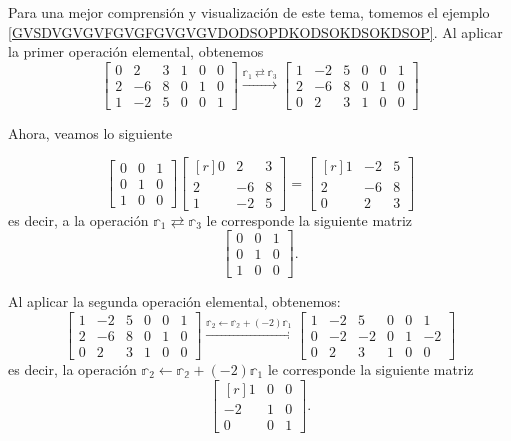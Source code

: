 Para una mejor comprensión y visualización de este tema, tomemos el ejemplo \ref{GVSDVGVGVFGVGFGVGVGVDODSOPDKODSOKDSOKDSOP}. Al aplicar la primer operación elemental, obtenemos
$$\left[ \begin{array}{rrr|rrr}
    0 & 2 & 3 & 1 & 0 & 0 \\
    2 & -6 & 8 & 0 & 1 & 0 \\
    1 & -2 & 5 & 0 & 0 & 1
\end{array} \right] \xrightarrow{\mathbb{r}_1 \rightleftarrows \mathbb{r}_3} \left[ \begin{array}{rrr|rrr}
    1 & -2 & 5 & 0 & 0 & 1 \\
    2 & -6 & 8 & 0 & 1 & 0 \\
    0 & 2 & 3 & 1 & 0 & 0
\end{array} \right]$$\newpage

Ahora, veamos lo siguiente

$$\begin{bmatrix}
    0 & 0 & 1 \\
    0 & 1 & 0 \\
    1 & 0 & 0
\end{bmatrix} \begin{bmatrix*}[r]
    0 & 2 & 3 \\
    2 & -6 & 8 \\
    1 & -2 & 5
\end{bmatrix*} = \begin{bmatrix*}[r]
    1 & -2 & 5 \\
    2 & -6 & 8 \\
    0 & 2 & 3
\end{bmatrix*}$$
es decir, a la operación $\mathbb{r}_1 \rightleftarrows \mathbb{r}_3$ le corresponde la siguiente matriz
$$\begin{bmatrix}
    0 & 0 & 1 \\
    0 & 1 & 0 \\
    1 & 0 & 0
\end{bmatrix}.$$

Al aplicar la segunda operación elemental, obtenemos:
$$\left[ \begin{array}{rrr|rrr}
    1 & -2 & 5 & 0 & 0 & 1 \\
    2 & -6 & 8 & 0 & 1 & 0 \\
    0 & 2 & 3 & 1 & 0 & 0
\end{array} \right] \xrightarrow{\mathbb{r}_2 \leftarrow \mathbb{r_2} + (-2) \mathbb{r}_1} \left[ \begin{array}{rrr|rrr}
    1 & -2 & 5 & 0 & 0 & 1 \\
    0 & -2 & -2 & 0 & 1 & -2 \\
    0 & 2 & 3 & 1 & 0 & 0
\end{array} \right]$$
es decir, la operación $\mathbb{r}_2 \leftarrow \mathbb{r_2} + (-2) \mathbb{r}_1$ le corresponde la siguiente matriz
$$\begin{bmatrix*}[r]
    1 & 0 & 0 \\
    -2 & 1 & 0 \\
    0 & 0 & 1
\end{bmatrix*}.$$

